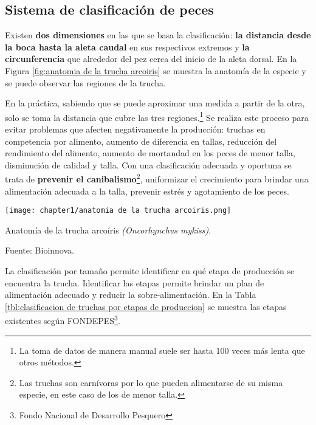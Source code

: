 \subsection{Sistema de clasificación de peces}
\label{ssec:sistema de clasificacion de peces}

Existen \textbf{dos dimensiones} en las que se basa la clasificación: \textbf{la distancia desde la boca hasta la aleta caudal} en sus respectivos extremos y \textbf{la circunferencia} que alrededor del pez cerca del inicio de la aleta dorsal. En la Figura \ref{fig:anatomia de la trucha arcoiris} se muestra la anatomía de la especie y se puede observar las regiones de la trucha.

En la práctica, sabiendo que se puede aproximar una medida a partir de la otra, solo se toma la distancia que cubre las tres regiones.\footnote{La toma de datos de manera manual suele ser hasta 100 veces más lenta que otros métodos.} Se realiza este proceso para evitar problemas que afecten negativamente la producción: truchas en competencia por alimento, aumento de diferencia en tallas, reducción del rendimiento del alimento, aumento de mortandad en los peces de menor talla, disminución de calidad y talla. Con una clasificación adecuada y oportuna se trata de \textbf{prevenir el canibalismo}\footnote{Las truchas son carnívoras por lo que pueden alimentarse de su misma especie, en este caso de los de menor talla.}, uniformizar el crecimiento para brindar una alimentación adecuada a la talla, prevenir estrés y agotamiento de los peces.\citep[p.~16]{Flores2010} 

\begin{myfigure}[H]
	\footnotesize\centering
	\texttt{[image: chapter1/anatomia de la trucha arcoiris.png]}
	\caption{Anatomía de la trucha arcoíris \textit{(Oncorhynchus mykiss)}.}
	\begin{myflushcenter}
		Fuente: Bioinnova.
	\end{myflushcenter}	
	\label{fig:anatomia de la trucha arcoiris}
\end{myfigure}


La clasificación por tamaño permite identificar en qué etapa de producción se encuentra la trucha. Identificar las etapas permite brindar un plan de alimentación adecuado y reducir la sobre-alimentación. En la Tabla \ref{tbl:clasificacion de truchas por etapas de produccion} se muestra las etapas existentes según FONDEPES\footnote{Fondo Nacional de Desarrollo Pesquero}.
 
